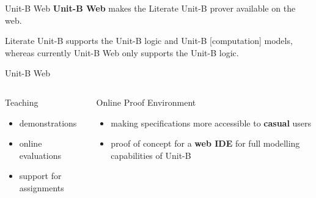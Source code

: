 \documentclass[11pt]{beamer}
\newcommand{\unitb}{Unit-B\xspace}
\begin{document}
\begin{frame}[fragile]{\unitb Web}
  \textbf{\unitb Web} makes the Literate \unitb prover available on
  the web.\newline \pause

  Literate Unit-B supports the Unit-B logic and Unit-B [computation]
  models, whereas currently Unit-B Web only supports the Unit-B logic.
\end{frame}

\begin{frame}[fragile]{\unitb Web}
  \begin{columns}[T,onlytextwidth]
      \begin{block}{Teaching}
        \begin{itemize}
        \item demonstrations
        \item online evaluations
        \item support for assignments
        \end{itemize}
      \end{block}
      \pause

      \begin{block}{Online Proof Environment}
        \begin{itemize}
        \item making specifications more accessible to \textbf{casual}
          users
        \item proof of concept for a \textbf{web IDE} for full
          modelling capabilities of \unitb
        \end{itemize}
      \end{block}
  \end{columns}
\end{frame}
\end{document}
